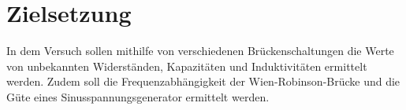 \section{Zielsetzung}

In dem Versuch sollen mithilfe von verschiedenen Brückenschaltungen die Werte von unbekannten Widerständen, Kapazitäten und Induktivitäten ermittelt werden. 
Zudem soll die Frequenzabhängigkeit der Wien-Robinson-Brücke und die Güte eines Sinusspannungsgenerator ermittelt werden. 